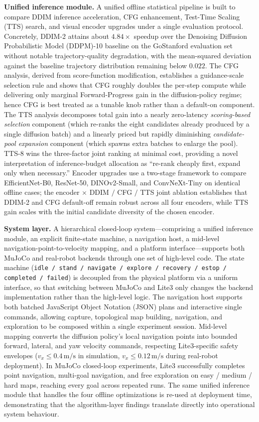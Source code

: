 \begin{digest}[en]
\textbf{Unified inference module.} A unified offline statistical pipeline is built to compare
DDIM inference acceleration, CFG enhancement, Test-Time Scaling (TTS) search, and visual encoder upgrades under a single evaluation protocol.
Concretely, DDIM-2 attains about $4.84\times$ speedup over the Denoising Diffusion Probabilistic Model (DDPM)-10 baseline on the
GoStanford evaluation set without notable trajectory-quality degradation, with the
mean-squared deviation against the baseline trajectory distribution remaining below
$0.022$. The CFG analysis, derived from score-function modification, establishes a
guidance-scale selection rule and shows that CFG roughly doubles the per-step compute
while delivering only marginal Forward-Progress gain in the diffusion-policy regime;
hence CFG is best treated as a tunable knob rather than a default-on component. The
TTS analysis decomposes total gain into a nearly zero-latency \emph{scoring-based
selection} component (which re-ranks the eight candidates already produced by a single
diffusion batch) and a linearly priced but rapidly diminishing \emph{candidate-pool
expansion} component (which spawns extra batches to enlarge the pool). TTS-8 wins the
three-factor joint ranking at minimal cost, providing a novel interpretation of
inference-budget allocation as ``re-rank cheaply first, expand only when necessary.''
Encoder upgrades use a two-stage framework to compare EfficientNet-B0, ResNet-50,
DINOv2-Small, and ConvNeXt-Tiny on identical offline cases; the encoder $\times$ DDIM
$/$ CFG $/$ TTS joint ablation establishes that DDIM-2 and CFG default-off remain
robust across all four encoders, while TTS gain scales with the initial candidate
diversity of the chosen encoder.

\textbf{System layer.} A hierarchical closed-loop system---comprising a unified
inference module, an explicit finite-state machine, a navigation host, a mid-level
navigation-point-to-velocity mapping, and a platform interface---supports both MuJoCo and
real-robot backends through one set of high-level code. The state machine
(\texttt{idle / stand / navigate / explore / recovery / estop / completed / failed})
is decoupled from the physical platform via a uniform interface, so that switching
between MuJoCo and Lite3 only changes the backend implementation rather than the
high-level logic. The navigation host supports both batched JavaScript Object Notation (JSON) plans and interactive
single commands, allowing capture, topological map building, navigation, and exploration to be
composed within a single experiment session. Mid-level mapping converts the diffusion
policy's local navigation points into bounded forward, lateral, and yaw velocity commands,
respecting Lite3-specific safety envelopes ($v_x \le 0.4\,\text{m/s}$ in simulation,
$v_x \le 0.12\,\text{m/s}$ during real-robot deployment). In MuJoCo closed-loop
experiments, Lite3 successfully completes point navigation, multi-goal navigation, and
free exploration on easy / medium / hard maps, reaching every goal across repeated
runs. The same unified inference module that handles the four offline optimizations is
re-used at deployment time, demonstrating that the algorithm-layer findings translate
directly into operational system behaviour.


\end{digest}
